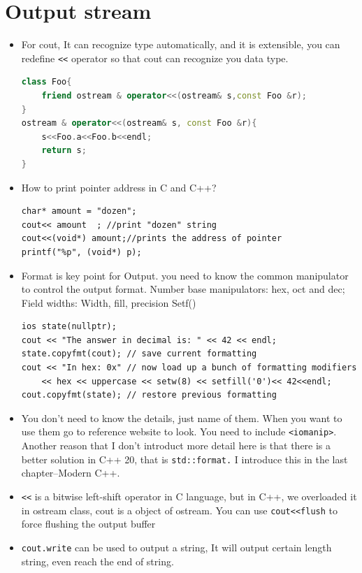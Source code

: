 \documentclass[a4paper,11pt,twoside]{book}
\begin{document}
\section{Output stream}

\begin{itemize}
	\item For cout, It can recognize type automatically, and it is extensible, you can redefine \verb=<<= operator so that cout can recognize you data type.
\begin{lstlisting}[frame=single, language=c++]
class Foo{
	friend ostream & operator<<(ostream& s,const Foo &r);
}
ostream & operator<<(ostream& s, const Foo &r){
	s<<Foo.a<<Foo.b<<endl;
    return s;
}
\end{lstlisting}
	
	\item  How to print pointer address in C and C++?
\begin{lstlisting}[numbers=none]
char* amount = "dozen";
cout<< amount  ; //print "dozen" string	
cout<<(void*) amount;//prints the address of pointer
printf("%p", (void*) p);
\end{lstlisting}
	
	\item Format is key point for Output. you need to know the common manipulator to control the output format.  Number base manipulators:  hex, oct  and dec; Field widths: Width,  fill, precision Setf()
\begin{lstlisting}[]
ios state(nullptr);
cout << "The answer in decimal is: " << 42 << endl;
state.copyfmt(cout); // save current formatting
cout << "In hex: 0x" // now load up a bunch of formatting modifiers
    << hex << uppercase << setw(8) << setfill('0')<< 42<<endl; 
cout.copyfmt(state); // restore previous formatting
\end{lstlisting}

	\item You don't need to know the details, just name of them. When you want to use them go to reference website to look.  You need to include \texttt{<iomanip>}. Another reason that I don't introduct more detail here is that there is a better solution in C++ 20, that is \texttt{std::format.}  I introduce this in the last chapter--Modern C++. 
	
	\item \verb=<<= is a bitwise left-shift operator in C language, but in C++, we overloaded it in ostream class, cout is a object of ostream.  You can use \verb=cout<<flush= to force flushing the output buffer

	\item \texttt{cout.write} can be used to output a string, It will output certain length string, even reach the end of string.
\end{itemize}
\end{document}
